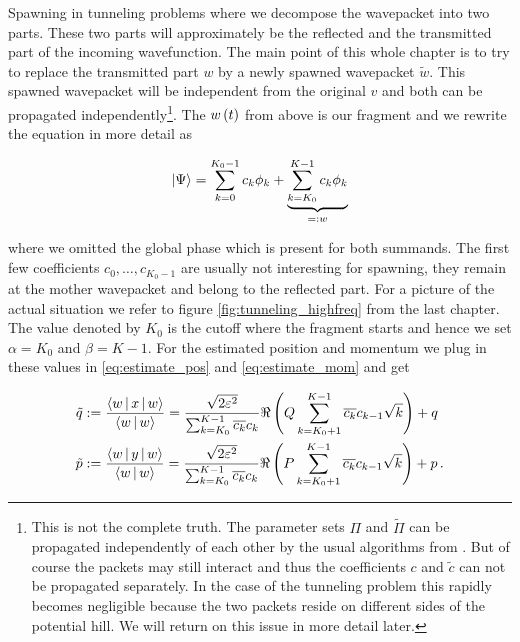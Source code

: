 \begin{chapter}{Spawning in tunneling problems}
where we decompose the wavepacket into two parts. These two parts will approximately
be the reflected and the transmitted part of the incoming wavefunction. The main
point of this whole chapter is to try to replace the transmitted part $w$ by a newly
spawned wavepacket $\tilde{w}$. This spawned wavepacket will be independent from
the original $v$ and both can be propagated independently\footnote{This is not the
complete truth. The parameter sets $\Pi$ and $\tilde{\Pi}$ can be propagated independently
of each other by the usual algorithms from \cite{FGL_semiclassical_dynamics}. But
of course the packets may still interact and thus the coefficients $c$ and $\tilde{c}$
can not be propagated separately. In the case of the tunneling problem this rapidly
becomes negligible because the two packets reside on different sides of the potential
hill. We will return on this issue in more detail later.}.
The $w\left( t \right)$ from above is our fragment and we rewrite the equation in more detail as

\begin{equation}
  \Ket{\Psi} = \sum_{k=0}^{K_0-1} c_k \phi_k + \underbrace{\sum_{k=K_0}^{K-1} c_k \phi_k}_{=: w}
\end{equation}

where we omitted the global phase which is present for both summands.
The first few coefficients $c_0, \ldots, c_{K_0-1}$ are usually not interesting for
spawning, they remain at the mother wavepacket and belong to the reflected part.
For a picture of the actual situation we refer to figure \ref{fig:tunneling_highfreq}
from the last chapter. The value denoted by $K_0$ is the cutoff where the fragment
starts and hence we set $\alpha = K_0$ and $\beta = K-1$. For the estimated position
and momentum we plug in these values in \eqref{eq:estimate_pos} and \eqref{eq:estimate_mom}
and get

\begin{align}
  \tilde{q} & := \frac{\Braket{w | x | w}}{\Braket{w|w}}
            = \frac{\sqrt{2 \varepsilon^2}}{\sum_{k=K_0}^{K-1} \overline{c_k} c_k} \Re \left(Q \sum_{k=K_0+1}^{K-1} \overline{c_k} c_{k-1} \sqrt{k} \right) + q
            \label{eq:estimate_pos_tunnel} \\
  \tilde{p} & := \frac{\Braket{w | y | w}}{\Braket{w|w}}
            = \frac{\sqrt{2 \varepsilon^2}}{\sum_{k=K_0}^{K-1} \overline{c_k} c_k} \Re \left(P \sum_{k=K_0+1}^{K-1} \overline{c_k} c_{k-1} \sqrt{k} \right) + p \,.
            \label{eq:estimate_mom_tunnel}
\end{align}


\end{chapter}
